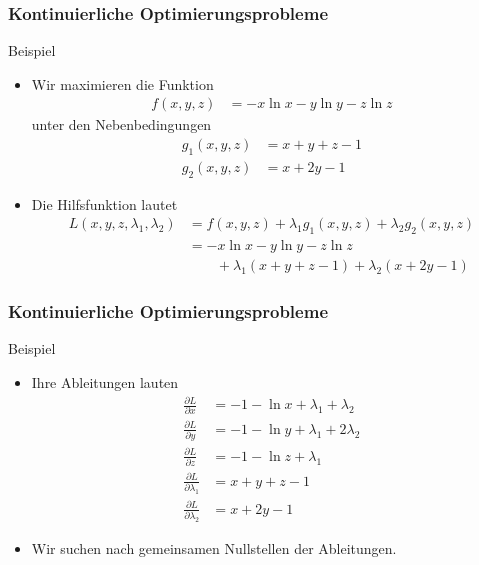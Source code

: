 \documentclass{beamer}
\newcommand{\mytitle}{Kontinuierliche Optimierungsprobleme}
\begin{document}
\begin{frame}\frametitle{\mytitle}
	\begin{block}{Beispiel}
		\begin{itemize}
			\item Wir maximieren die Funktion 
				\begin{align*}
					f(x,y,z)&=-x\ln x-y\ln y-z\ln z
				\end{align*}
				unter den Nebenbedingungen
				\begin{align*}
					g_1(x,y,z)&=x+y+z-1\\
					g_2(x,y,z)&=x+2y-1
				\end{align*}
			\item Die Hilfsfunktion lautet
				\begin{align*}
					L(x,y,z,\lambda_1,\lambda_2)&=f(x,y,z)+\lambda_1g_1(x,y,z)+\lambda_2g_2(x,y,z)\\
												&=-x\ln x-y\ln y-z\ln z\\&\qquad+\lambda_1(x+y+z-1)+\lambda_2(x+2y-1)
				\end{align*}
		\end{itemize}
	\end{block}
\end{frame}

\begin{frame}\frametitle{\mytitle}
	\begin{block}{Beispiel}
		\begin{itemize}
			\item Ihre Ableitungen lauten
				\begin{align*}
					\frac{\partial L}{\partial x}&=-1-\ln x+\lambda_1+\lambda_2\\
					\frac{\partial L}{\partial y}&=-1-\ln y+\lambda_1+2\lambda_2\\
					\frac{\partial L}{\partial z}&=-1-\ln z+\lambda_1\\
					\frac{\partial L}{\partial \lambda_1}&=x+y+z-1\\
					\frac{\partial L}{\partial \lambda_2}&=x+2y-1
				\end{align*}
			\item Wir suchen nach gemeinsamen Nullstellen der Ableitungen.
		\end{itemize}
	\end{block}
\end{frame}
\end{document}
